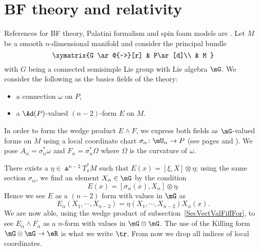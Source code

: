 \section{BF theory and relativity}

References for BF theory, Palatini formalism and spin foam models are \cite{bkindep,degesols,itospinfoam,BenyAshHamil}. Let $M$ be a smooth $n$-dimensional manifold and consider the principal bundle
\begin{equation}
	\xymatrix{%
		G   \ar@{~>}[r]		&	P\ar[d]\\
		&	M
	}
\end{equation}
with $G$ being a connected semisimple Lie group with Lie algebra $\mG$. We consider the following as the basics fields of the theory:
\begin{itemize}
	\item a connection $\omega$ on $P$,
	\item a $\Ad(P)$-valued $(n-2)$-form $E$ on $M$.
\end{itemize}
In order to form the wedge product $E\wedge F$, we express both fields as $\mG$-valued forms on $M$ using a local coordinate chart $\sigma_{\alpha}\colon \mU_{\alpha}\to P$ (see pages \pageref{PgLocSecCurv} and \pageref{PgLocSecConn} ). We pose $A_{\alpha}=\sigma_{\alpha}^*\omega$ and $F_{\alpha}=\sigma_{\alpha}^*\Omega$ where $\Omega$ is the curvature of $\omega$.

There exists a $\eta\in\Wedge^{n-2}T_x^*M$ such that $E(x)=[\xi,X]\otimes\eta$; using the same section $\sigma_{\alpha}$, we find an element $X_{\alpha}\in\mG$ by the condition
\[
	E(x)=[\sigma_{\alpha}(x),X_{\alpha}]\otimes\eta.
\]
Hence we see $E$ as a $(n-2)$ form with values in $\mG$ as
\begin{equation}
	E_{\alpha}(X_1,\cdots,X_{n-2})=\eta(X_1,\cdots,X_{n-2})X_{\alpha}(x).
\end{equation}
We are now able, using the wedge product of subsection~\ref{SecVectValFiffFor}, to see $E_{\alpha}\wedge F_{\alpha}$ as a $n$-form with values in $\mG\otimes\mG$. The use of the Killing form $\mG\otimes\mG\to\eR$ is what we write $\tr$. From now we drop all indices of local coordinates.

